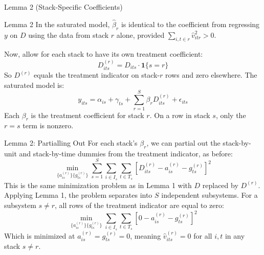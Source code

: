 \documentclass[11pt]{beamer}
\begin{document}
\begin{frame}{Lemma 2 (Stack-Specific Coefficients)}
    \begin{block}{Lemma 2}
        In the saturated model, $\hat{\beta}_r$ is identical to the coefficient
        from regressing $y$ on $D$ using the data from stack $r$ alone, provided
        $\sum_{i,t \in r} \hat{v}_{itr}^2 > 0$.
    \end{block}

    Now, allow for each stack to have its own treatment coefficient:
    \[
        D^{(r)}_{its} = D_{its} \cdot \mathbf{1}\{s = r\}
    \]
    So $D^{(r)}$ equals the treatment indicator on stack-$r$ rows and zero
    elsewhere. The saturated model is:
    \[
        y_{its} = \alpha_{is} + \gamma_{ts}
        + \sum_{r=1}^{S} \beta_r D^{(r)}_{its} + \epsilon_{its}
    \]
    Each $\beta_r$ is the treatment coefficient for stack $r$. On a row in stack
    $s$, only the $r = s$ term is nonzero.
\end{frame}

\begin{frame}{Lemma 2: Partialling Out}
    For each stack's $\beta_r$, we can partial out the stack-by-unit and
    stack-by-time dummies from the treatment indicator, as before:
    \[
        \min_{\{a^{(r)}_{is}\}\{g^{(r)}_{ts}\}}
        \sum_{s=1}^{S} \sum_{i \in I_s} \sum_{t \in T_s}
        \left[ D^{(r)}_{its} - a^{(r)}_{is} - g^{(r)}_{ts} \right]^2
    \]
    This is the same minimization problem as in Lemma 1 with $D$ replaced by
    $D^{(r)}$. Applying Lemma 1, the problem separates into $S$ independent
    subsystems. For a subsystem $s \neq r$, all rows of the treatment indicator
    are equal to zero:
    \[
        \min_{\{a^{(r)}_{is}\}\{g^{(r)}_{ts}\}}
        \sum_{i \in I_s} \sum_{t \in T_s}
        \left[ 0 - a^{(r)}_{is} - g^{(r)}_{ts} \right]^2
    \]
    Which is minimized at $a^{(r)}_{is} = g^{(r)}_{ts} = 0$, meaning
    $\hat{v}^{(r)}_{its} = 0$ for all $i, t$ in any stack $s \neq r$.
\end{frame}
\end{document}

